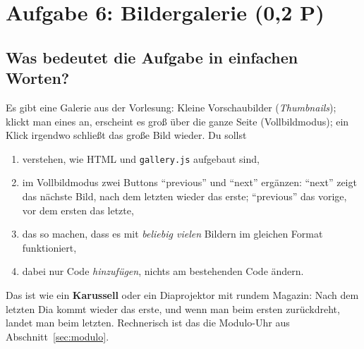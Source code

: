 \documentclass[a4paper,11pt]{article}
\begin{document}
\section{Aufgabe 6: Bildergalerie (0,2 P)}\label{sec:a6}

\subsection{Was bedeutet die Aufgabe in einfachen Worten?}

Es gibt eine Galerie aus der Vorlesung: Kleine Vorschaubilder (\emph{Thumbnails}); klickt man eines an, erscheint
es groß über die ganze Seite (Vollbildmodus); ein Klick irgendwo schließt das große Bild wieder. Du sollst
\begin{enumerate}[nosep]
\item verstehen, wie HTML und \texttt{gallery.js} aufgebaut sind,
\item im Vollbildmodus zwei Buttons "`previous"' und "`next"' ergänzen: "`next"' zeigt das nächste Bild, nach dem
      letzten wieder das erste; "`previous"' das vorige, vor dem ersten das letzte,
\item das so machen, dass es mit \emph{beliebig vielen} Bildern im gleichen Format funktioniert,
\item dabei nur Code \emph{hinzufügen}, nichts am bestehenden Code ändern.
\end{enumerate}

\begin{analogie}
Das ist wie ein \textbf{Karussell} oder ein Diaprojektor mit rundem Magazin: Nach dem letzten Dia kommt wieder das
erste, und wenn man beim ersten zurückdreht, landet man beim letzten. Rechnerisch ist das die Modulo-Uhr aus
Abschnitt~\ref{sec:modulo}.
\end{analogie}
\end{document}
